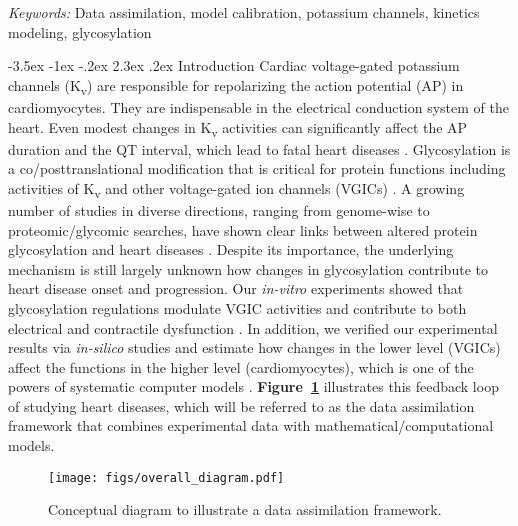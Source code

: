 \documentclass[11pt]{article}
\makeatletter
\renewcommand\section{\@startsection {section}{1}{\z@}%
                                   {-3.5ex \@plus -1ex \@minus -.2ex}%
                                   {2.3ex \@plus.2ex}%
                                   {\normalfont\fontfamily{phv}\fontsize{16}{19}\bfseries}}
\makeatother
\begin{document}
\noindent%
{\it Keywords:} Data assimilation, model calibration, potassium channels, kinetics modeling, glycosylation

{} %

\section{Introduction}
Cardiac voltage-gated potassium channels (K\textsubscript{v}) are responsible for repolarizing the action potential (AP) in cardiomyocytes. They are indispensable in the electrical conduction system of the heart. Even modest changes in K\textsubscript{v} activities can significantly affect the AP duration and the QT interval, which lead to fatal heart diseases \citep{ravens2008role}. Glycosylation is a co/posttranslational modification that is critical for protein functions including activities of K\textsubscript{v} and other voltage-gated ion channels (VGICs) \citep{ohtsubo2006glycosylation,ednie2012modulation}. A growing number of studies in diverse directions, ranging from genome-wise to proteomic/glycomic searches, have shown clear links between altered protein glycosylation and heart diseases \citep{yung2004gene,yang2015glycoproteins,miura2016glycomics,nagai2016aberrant}. Despite its importance, the underlying mechanism is still largely unknown how changes in glycosylation contribute to heart disease onset and progression. Our \textit{in-vitro} experiments showed that glycosylation regulations modulate VGIC activities and contribute to both electrical and contractile dysfunction \citep{ednie2013sialicNav1,ednie2015sialicKv,ednie2019reduced}. In addition, we verified our experimental results via \textit{in-silico} studies and estimate how changes in the lower level (VGICs) affect the functions in the higher level (cardiomyocytes), which is one of the powers of systematic computer models \citep{du2013silico,du2015statistical,du2017silico,kim2022simulation}. \textbf{Figure~\ref{fig:framework_diagram}} illustrates this feedback loop of studying heart diseases, which will be referred to as the data assimilation framework that combines experimental data with mathematical/computational models.
\begin{figure}[!ht]
    \centering
    \texttt{[image: figs/overall\_diagram.pdf]}
    \caption{Conceptual diagram to illustrate a data assimilation framework.}
    \label{fig:framework_diagram}
\end{figure}
\end{document}
